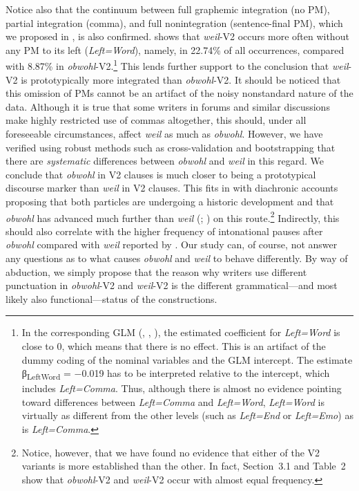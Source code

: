 Notice also that the continuum between full graphemic integration (no PM), partial integration (comma), and full nonintegration (sentence-final PM), which we proposed in , is also confirmed.  shows that \textit{weil}{}-V2 occurs more often without any PM to its left (\textit{Left=Word}), namely, in 22.74\% of all occurrences, compared with 8.87\% in \textit{obwohl}{}-V2.\footnote{In the corresponding GLM (, , ), the estimated coefficient for \textit{Left=Word} is close to 0, which means that there is no effect. This is an artifact of the dummy coding of the nominal variables and the GLM intercept. The estimate β\textsubscript{LeftWord} = $-$0.019 has to be interpreted relative to the intercept, which includes \textit{Left=Comma}. Thus, although there is almost no evidence pointing toward differences between \textit{Left=Comma} and \textit{Left=Word}, \textit{Left=Word} is virtually as different from the other levels (such as \textit{Left=End} or \textit{Left=Emo}) as is \textit{Left=Comma}.} This lends further support to the conclusion that \textit{weil}{}-V2 is prototypically more integrated than \textit{obwohl}{}-V2. It should be noticed that this omission of PMs cannot be an artifact of the noisy nonstandard nature of the data. Although it is true that some writers in forums and similar discussions make highly restricted use of commas altogether, this should, under all foreseeable circumstances, affect \textit{weil} as much as \textit{obwohl}. However, we have verified using robust methods such as cross-validation and bootstrapping that there are \textit{systematic} differences between \textit{obwohl} and \textit{weil} in this regard. We conclude that \textit{obwohl} in V2 clauses is much closer to being a prototypical discourse marker than \textit{weil} in V2 clauses. This fits in with diachronic accounts proposing that both particles are undergoing a historic development and that \textit{obwohl} has advanced much further than \textit{weil} (\citealt{GohlGünthner1999}; \citealt{Günthner2003}) on this route.\footnote{Notice, however, that we have found no evidence that either of the V2 variants is more established than the other. In fact, Section~3.1 and Table~2 show that \textit{obwohl}{}-V2 and \textit{weil}{}-V2 occur with almost equal frequency.} Indirectly, this should also correlate with the higher frequency of intonational pauses after \textit{obwohl} compared with \textit{weil} reported by \citet{Breindl2009}. Our study can, of course, not answer any questions as to what causes \textit{obwohl} and \textit{weil} to behave differently. By way of abduction, we simply propose that the reason why writers use different punctuation in \textit{obwohl}{}-V2 and \textit{weil}{}-V2 is the different grammatical—and most likely also functional—status of the constructions.




